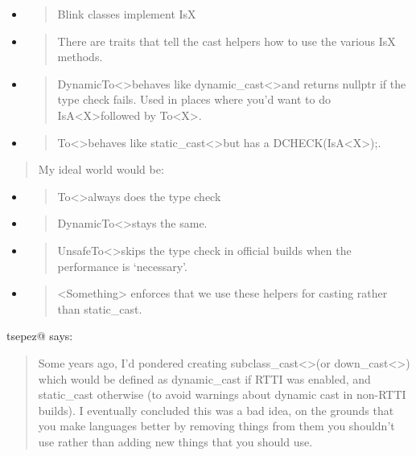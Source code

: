 \documentclass[a4paper,12pt,notitlepage,twoside,openright]{article}
\begin{document}
{\begin{itemize}
\item
  \begin{quote}
  Blink classes implement IsX
  \end{quote}
\item
  \begin{quote}
  There are traits that tell the cast helpers how to use the
  various IsX methods.
  \end{quote}
\item
  \begin{quote}
  DynamicTo\textless\textgreater behaves
  like dynamic\_cast\textless\textgreater and returns nullptr if the
  type check fails. Used in places where you'd want to
  do IsA\textless X\textgreater followed by To\textless X\textgreater.
  \end{quote}
\item
  \begin{quote}
  To\textless\textgreater behaves
  like static\_cast\textless\textgreater but has
  a DCHECK(IsA\textless X\textgreater);.
  \end{quote}
\end{itemize}

\begin{quote}
My ideal world would be:
\end{quote}

\begin{itemize}
\item
  \begin{quote}
  To\textless\textgreater always does the type check
  \end{quote}
\item
  \begin{quote}
  DynamicTo\textless\textgreater stays the same.
  \end{quote}
\item
  \begin{quote}
  UnsafeTo\textless\textgreater skips the type check in official builds
  when the performance is `necessary'.
  \end{quote}
\item
  \begin{quote}
  \textless Something\textgreater{} enforces that we use these helpers
  for casting rather than static\_cast.
  \end{quote}
\end{itemize}

tsepez@ says:

\begin{quote}
Some years ago, I'd pondered
creating subclass\_cast\textless\textgreater (or down\_cast\textless\textgreater)
which would be defined as dynamic\_cast if RTTI was enabled,
and static\_cast otherwise (to avoid warnings about dynamic cast in
non-RTTI builds). I eventually concluded this was a bad idea, on the
grounds that you make languages better by removing things from them you
shouldn't use rather than adding new things that you should use.
\end{quote}

}
\end{document}
